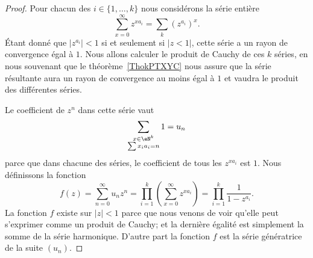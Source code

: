 \begin{proof}
    Pour chacun des \( i\in\{ 1,\ldots, k \}\) nous considérons la série entière
    \begin{equation}
        \sum_{x=0}^{\infty}z^{xa_i}=\sum_k(z^{a_i})^x.
    \end{equation}
    Étant donné que \( | z^{a_i} |<1\) si et seulement si \( | z<1 |\), cette série a un rayon de convergence égal à \( 1\). Nous allons calculer le produit de Cauchy de ces \( k\) séries, en nous souvenant que le théorème~\ref{ThokPTXYC} nous assure que la série résultante aura un rayon de convergence au moins égal à \( 1\) et vaudra le produit des différentes séries.

    Le coefficient de \( z^n\) dans cette série vaut
    \begin{equation}
        \sum_{\substack{x\in \eN^k\\\sum x_ia_i=n}}1=u_n
    \end{equation}
    parce que dans chacune des séries, le coefficient de tous les \( z^{xa_i}\) est \( 1\). Nous définissons la fonction
    \begin{equation}    \label{EqKTRNFSl}
        f(z)=\sum_{n=0}^{\infty}u_nz^n=\prod_{i=1}^k\left( \sum_{x=0}^{\infty}z^{xa_i} \right)=\prod_{i=1}^k\frac{1}{ 1-z^{a_i} }.
    \end{equation}
    La fonction \( f\) existe sur \( | z |<1\) parce que nous venons de voir qu'elle peut  s'exprimer comme un produit de Cauchy; et la dernière égalité est simplement la somme de la série harmonique. D'autre part la fonction \( f\) est la série génératrice de la suite \( (u_n)\).


\end{proof}
